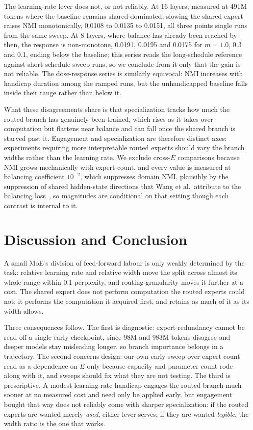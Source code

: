 \documentclass[conference,11pt]{IEEEtran}
\begin{document}
The learning-rate lever does not, or not reliably. At 16 layers, measured at 491M tokens where the
baseline remains shared-dominated, slowing the shared expert raises NMI monotonically, 0.0108 to
0.0135 to 0.0151, all three points single runs from the same sweep. At 8 layers, where balance has
already been reached by then, the response is non-monotone, 0.0191, 0.0195 and 0.0175 for $m =
1.0$, 0.3 and 0.1, ending below the baseline; this series reads the long-schedule reference
against short-schedule sweep runs, so we conclude from it only that the gain is not reliable. The
dose-response series is similarly equivocal: NMI increases with handicap duration among the ramped
runs, but the unhandicapped baseline falls inside their range rather than below it.

What these disagreements share is that specialization tracks how much the routed branch has
genuinely been trained, which rises as it takes over computation but flattens near balance and can
fall once the shared branch is starved past it. Engagement and specialization are therefore
distinct axes: experiments requiring more interpretable routed experts should vary the branch
widths rather than the learning rate. We exclude cross-$E$ comparisons because NMI
grows mechanically with expert count, and every value is measured at balancing coefficient
$10^{-2}$, which suppresses domain NMI, plausibly by the suppression of shared hidden-state
directions that Wang et al.\ attribute to the balancing loss~\cite{wang2026myth}, so magnitudes are conditional on that setting though each
contrast is internal to it.

\section{Discussion and Conclusion}

A small MoE's division of feed-forward labour is only weakly determined by the task: relative
learning rate and relative width move the split across almost its whole range within 0.1
perplexity, and routing granularity moves it further at a cost. The shared
expert does not perform computation the routed experts could not; it performs the computation it
acquired first, and retains as much of it as its width allows.

Three consequences follow. The first is diagnostic: expert redundancy cannot be read off a single
early checkpoint, since 98M and 983M tokens disagree and deeper models stay misleading longer, so
branch importance belongs in a trajectory. The second concerns design: our own early sweep over
expert count read as a dependence on $E$ only because capacity and parameter count rode along with
it, and sweeps should fix what they are not testing. The third is prescriptive. A modest
learning-rate handicap engages the routed branch much sooner at no measured cost and need only be
applied early, but engagement bought that way does not reliably come with sharper specialization:
if the routed experts are wanted merely \emph{used}, either lever serves; if they are wanted
\emph{legible}, the width ratio is the one that works.
\end{document}
